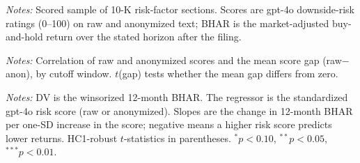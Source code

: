 \documentclass[12pt]{article}
\begin{document}
\FloatBarrier
\newpage

\begin{table}[htbp]\centering
\begin{threeparttable}
\caption{Summary statistics}\label{tab:sumstats}\small

\begin{tablenotes}\small\item \textit{Notes:} Scored sample of 10-K risk-factor sections.
Scores are gpt-4o downside-risk ratings (0--100) on raw and anonymized text; BHAR is the
market-adjusted buy-and-hold return over the stated horizon after the filing.
\end{tablenotes}
\end{threeparttable}
\end{table}

\begin{table}[htbp]\centering
\begin{threeparttable}
\caption{Do raw and anonymized scores agree?}\label{tab:agree}\small

\begin{tablenotes}\small\item \textit{Notes:} Correlation of raw and anonymized scores and
the mean score gap (raw$-$anon), by cutoff window. $t$(gap) tests whether the mean gap
differs from zero.
\end{tablenotes}
\end{threeparttable}
\end{table}

\begin{table}[htbp]\centering
\begin{threeparttable}
\caption{Main placebo: return predictability of the LLM score, raw vs. anonymized,
pre- vs. post-cutoff}\label{tab:main}\small

\begin{tablenotes}\small\item \textit{Notes:} DV is the winsorized 12-month BHAR. The
regressor is the standardized gpt-4o risk score (raw or anonymized). Slopes are the change
in 12-month BHAR per one-SD increase in the score; negative means a higher risk score
predicts lower returns. HC1-robust $t$-statistics in parentheses.
$^{*}p<0.10$, $^{**}p<0.05$, $^{***}p<0.01$.
\end{tablenotes}
\end{threeparttable}
\end{table}
\end{document}
